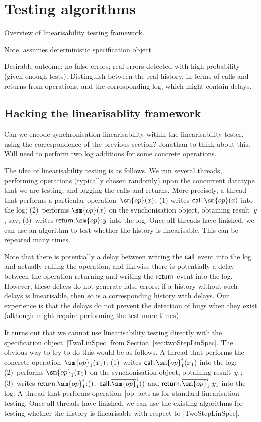 \section{Testing algorithms}

Overview of linearisability testing framework. 

Note, assumes deterministic specification object. 

Desirable outcome: no false errors; real errors detected with high probability
(given enough tests).  Distinguish between the real history, in terms of calls
and returns from operations, and the corresponding log, which might contain
delays.  


\subsection{Hacking the linearisablity framework}

Can we encode synchronisation linearisability within the linearisability
tester, using the correspondence of the previous section?  Jonathan to think
about this.  Will need to perform two log additions for some concrete
operations.

The idea of linearisability testing is as follows.  We run several threads,
performing operations (typically chosen randomly) upon the concurrent datatype
that we are testing, and logging the calls and returns.  More precisely, a
thread that performs a particular operation~$\sm{op}(x)$: (1) writes
$\call.\sm{op}(x)$ into the log; (2)~performs $\sm{op}(x)$ on the
synchonisation object, obtaining result~$y$, say; (3)~writes $\return.\sm{op}
\:: y$ into the log.  Once all threads have finished, we can use an algorithm
to test whether the history is linearisable.  This can be repeated many times.

Note that there is potentially a delay between writing the $\mathsf{call}$ event into
the log and actually calling the operation; and likewise there is potentially
a delay between the operation returning and writing the $\mathsf{return}$ event into
the log.  However, these delays do not generate false errors: if a history
without such delays is linearisable, then so is a corresponding history with
delays.  Our experience is that the delays do not prevent the detection of
bugs when they exist (although might require performing the test more times). 

It turns out that we cannot use linearisability testing directly with the
specification object~|TwoLinSpec| from Section~\ref{sec:twoStepLinSpec}.  The
obvious way to try to do this would be as follows.  A thread that performs the
concrete operation~$\sm{op}_1(x_1)$: (1)~writes $\call.\sm{op}_1^i(x_1)$ into
the log; (2)~performs $\sm{op}_1(x_1)$ on the synchonisation object, obtaining
result~$y_1$; (3)~writes $\return.\sm{op}_1^i \:: ()$,\,
$\call.\overline{\sm{op}}_1^i()$ and $\return.\overline{\sm{op}}_1^i \:: y_1$
into the log.  A thread that performs operation~|op| acts as for standard
linearisation testing.  Once all threads have finished, we can use the
existing algorithms for testing whether the history is linearisable with
respect to |TwoStepLinSpec|.


